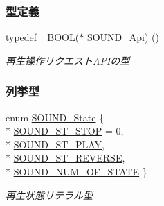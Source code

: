 \subsubsection*{型定義}
\begin{DoxyCompactItemize}
\item 
typedef \hyperlink{stddef_8h_afbf708854fe02af8475a9ba02f3196cb_afbf708854fe02af8475a9ba02f3196cb}{\+\_\+\+B\+O\+O\+L}($\ast$ \hyperlink{sound_8h_a25ea542ecfc47a97aed27c42ee791f3f_a25ea542ecfc47a97aed27c42ee791f3f}{S\+O\+U\+N\+D\+\_\+\+Api}) ()
\begin{DoxyCompactList}\small\item\em 再生操作リクエスト\+A\+P\+Iの型 \end{DoxyCompactList}\end{DoxyCompactItemize}
\subsubsection*{列挙型}
\begin{DoxyCompactItemize}
\item 
enum \hyperlink{sound_8h_abb21e5244ee60939e8a32ec932e9d7b3_abb21e5244ee60939e8a32ec932e9d7b3}{S\+O\+U\+N\+D\+\_\+\+State} \{ \\*
\hyperlink{sound_8h_abb21e5244ee60939e8a32ec932e9d7b3_abb21e5244ee60939e8a32ec932e9d7b3ad0949bdef5777ac0e886e8b7a3ac9e93}{S\+O\+U\+N\+D\+\_\+\+S\+T\+\_\+\+S\+T\+O\+P} = 0, 
\\*
\hyperlink{sound_8h_abb21e5244ee60939e8a32ec932e9d7b3_abb21e5244ee60939e8a32ec932e9d7b3a69af3ab302bcb6f9e2dabc363ea2f322}{S\+O\+U\+N\+D\+\_\+\+S\+T\+\_\+\+P\+L\+A\+Y}, 
\\*
\hyperlink{sound_8h_abb21e5244ee60939e8a32ec932e9d7b3_abb21e5244ee60939e8a32ec932e9d7b3a8ce8853fb3709716f052d68eb827c92f}{S\+O\+U\+N\+D\+\_\+\+S\+T\+\_\+\+R\+E\+V\+E\+R\+S\+E}, 
\\*
\hyperlink{sound_8h_abb21e5244ee60939e8a32ec932e9d7b3_abb21e5244ee60939e8a32ec932e9d7b3ac0294a814acb2bcb5d3c4cefef53a22c}{S\+O\+U\+N\+D\+\_\+\+N\+U\+M\+\_\+\+O\+F\+\_\+\+S\+T\+A\+T\+E}
 \}\begin{DoxyCompactList}\small\item\em 再生状態リテラル型 \end{DoxyCompactList}
\end{DoxyCompactItemize}
